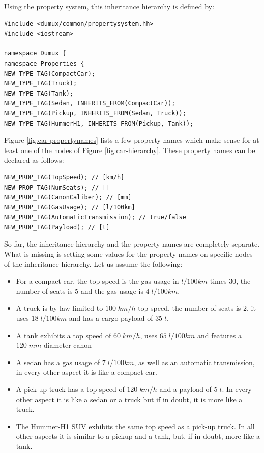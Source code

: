 Using the \Dumux property system, this inheritance hierarchy is
defined by:
\begin{lstlisting}[name=propsyscars,style=DumuxCode]
#include <dumux/common/propertysystem.hh>
#include <iostream>

namespace Dumux {
namespace Properties {
NEW_TYPE_TAG(CompactCar);
NEW_TYPE_TAG(Truck);
NEW_TYPE_TAG(Tank);
NEW_TYPE_TAG(Sedan, INHERITS_FROM(CompactCar));
NEW_TYPE_TAG(Pickup, INHERITS_FROM(Sedan, Truck));
NEW_TYPE_TAG(HummerH1, INHERITS_FROM(Pickup, Tank));
\end{lstlisting}

Figure \ref{fig:car-propertynames} lists a few property names which
make sense for at least one of the nodes of Figure
\ref{fig:car-hierarchy}. These property names can be declared as
follows:
\begin{lstlisting}[name=propsyscars,style=DumuxCode]
NEW_PROP_TAG(TopSpeed); // [km/h]
NEW_PROP_TAG(NumSeats); // []
NEW_PROP_TAG(CanonCaliber); // [mm]
NEW_PROP_TAG(GasUsage); // [l/100km]
NEW_PROP_TAG(AutomaticTransmission); // true/false
NEW_PROP_TAG(Payload); // [t]
\end{lstlisting}

\noindent
So far, the inheritance hierarchy and the property names are completely
separate. What is missing is setting some values for the property
names on specific nodes of the inheritance hierarchy. Let us assume
the following:
\begin{itemize}
\item For a compact car, the top speed is the gas usage in $l/100km$
  times $30$, the number of seats is $5$ and the gas usage is
  $4\;l/100km$.
\item A truck is by law limited to $100\;km/h$ top speed, the number
  of seats is $2$, it uses $18\;l/100km$ and has a cargo payload of
  $35\;t$.
\item A tank exhibits a top speed of $60\;km/h$, uses $65\;l/100km$
  and features a $120\;mm$ diameter canon 
\item A sedan has a gas usage of $7\;l/100km$, as well as an automatic
  transmission, in every other aspect it is like a compact car.
\item A pick-up truck has a top speed of $120\;km/h$ and a payload of
  $5\;t$. In every other aspect it is like a sedan or a truck but if in
  doubt, it is more like a truck.
\item The Hummer-H1 SUV exhibits the same top speed as a pick-up
  truck.  In all other aspects it is similar to a pickup and a tank,
  but, if in doubt, more like a tank.
\end{itemize}

